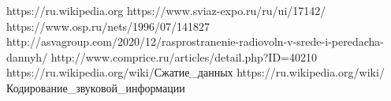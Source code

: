 \documentclass[a4paper]{report}
\begin{document}
\newpage
\begin{thebibliography}{}
\bibitem{} https://ru.wikipedia.org
\bibitem{} https://www.sviaz-expo.ru/ru/ui/17142/
\bibitem{} https://www.osp.ru/nets/1996/07/141827
\bibitem{} http://asvagroup.com/2020/12/rasprostranenie-radiovoln-v-srede-i-peredacha-dannyh/
\bibitem{} http://www.comprice.ru/articles/detail.php?ID=40210
\bibitem{} https://ru.wikipedia.org/wiki/Сжатие\_данных
\bibitem{} https://ru.wikipedia.org/wiki/Кодирование\_звуковой\_информации

\end{thebibliography}
\end{document}
